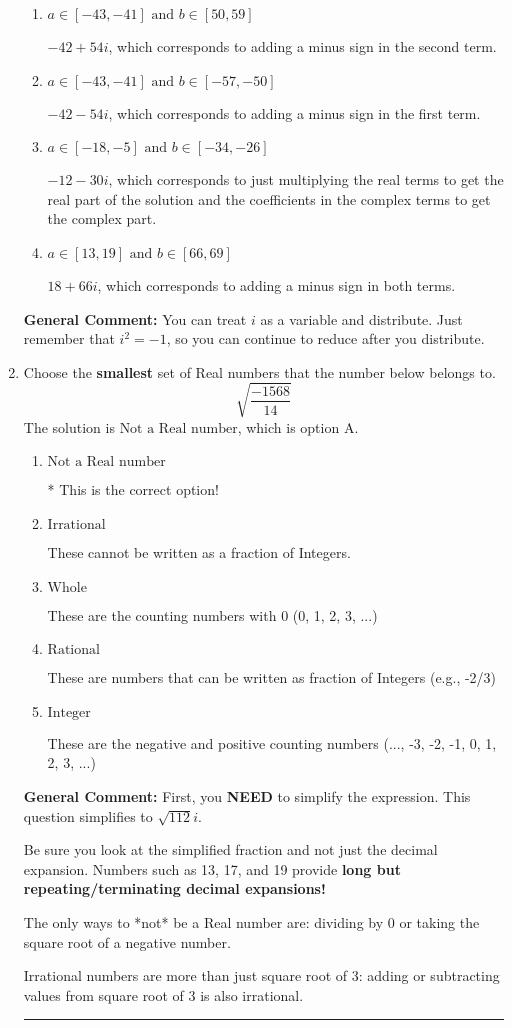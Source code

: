 \documentclass{extbook}[14pt]
\newcommand{\litem}[1]{\item #1

\rule{\textwidth}{0.4pt}}
\begin{document}
\begin{enumerate}
{\begin{enumerate}[label=\Alph*.]
* $18 - 66 i$, which is the correct option.
\item \( a \in [-43, -41] \text{ and } b \in [50, 59] \)

 $-42 + 54 i$, which corresponds to adding a minus sign in the second term.
\item \( a \in [-43, -41] \text{ and } b \in [-57, -50] \)

 $-42 - 54 i$, which corresponds to adding a minus sign in the first term.
\item \( a \in [-18, -5] \text{ and } b \in [-34, -26] \)

 $-12 - 30 i$, which corresponds to just multiplying the real terms to get the real part of the solution and the coefficients in the complex terms to get the complex part.
\item \( a \in [13, 19] \text{ and } b \in [66, 69] \)

 $18 + 66 i$, which corresponds to adding a minus sign in both terms.
\end{enumerate}

\textbf{General Comment:} You can treat $i$ as a variable and distribute. Just remember that $i^2=-1$, so you can continue to reduce after you distribute.
}
\litem{
Choose the \textbf{smallest} set of Real numbers that the number below belongs to.
\[ \sqrt{\frac{-1568}{14}} \]The solution is \( \text{Not a Real number} \), which is option A.\begin{enumerate}[label=\Alph*.]
\item \( \text{Not a Real number} \)

* This is the correct option!
\item \( \text{Irrational} \)

These cannot be written as a fraction of Integers.
\item \( \text{Whole} \)

These are the counting numbers with 0 (0, 1, 2, 3, ...)
\item \( \text{Rational} \)

These are numbers that can be written as fraction of Integers (e.g., -2/3)
\item \( \text{Integer} \)

These are the negative and positive counting numbers (..., -3, -2, -1, 0, 1, 2, 3, ...)
\end{enumerate}

\textbf{General Comment:} First, you \textbf{NEED} to simplify the expression. This question simplifies to $\sqrt{112} i$. 
 
 Be sure you look at the simplified fraction and not just the decimal expansion. Numbers such as 13, 17, and 19 provide \textbf{long but repeating/terminating decimal expansions!} 
 
 The only ways to *not* be a Real number are: dividing by 0 or taking the square root of a negative number. 
 
 Irrational numbers are more than just square root of 3: adding or subtracting values from square root of 3 is also irrational.
}
\end{enumerate}
\end{document}
